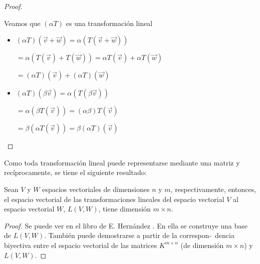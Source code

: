 \begin{corollary}
\begin{proof}
\begin{itemize}
Veamos que $(\alpha T)$ es una transformación lineal

\bigskip

\begin{itemize}
\item $(\alpha T)(\vec{v} + \vec{w} ) = \alpha (T(\vec{v} + \vec{w} ))$

$= \alpha (T(\vec{v}) + T(\vec{w} ))=  \alpha T(\vec{v}) + \alpha T(\vec{w} )    $

$=(\alpha T)(\vec{v}) + (\alpha T)(\vec{w} )$


\bigskip

\item 
$ (\alpha T)( \beta  \vec{v})=  \alpha (T( \beta  \vec{v})) $ 

$= \alpha (  \beta   T(  \vec{v})) =  (\alpha  \beta)   T(  \vec{v})  $

$= \beta (\alpha T(  \vec{v}))=  \beta (\alpha T)(  \vec{v})  $
\end{itemize}


\end{itemize}

\end{proof}
\end{corollary}



\bigskip

\bigskip

Como toda transformación lineal puede representarse mediante una matriz y recíprocamente, se tiene el siguiente resultado:


\bigskip

\bigskip

\begin{corollary}
\label{TEO3}

Sean $V$ y $W$ espacios vectoriales de dimensiones $n$ y $m$, respectivamente, entonces, el espacio vectorial de las transformaciones lineales del espacio vectorial  $V$ al espacio vectorial $W$, $L(V,W)$,  tiene dimensión $m\times n$.



\begin{proof}
 Se puede ver   en el libro de  E. Hernández \cite{hernandez}. En ella se construye una base de $L(V,W)$. También puede demostrarse  a partir de la correspon-\ dencia biyectiva entre el espacio vectorial de las matrices $K^{m \times n}$ (de dimensión $m \times n$) y  $L(V,W)$.

\end{proof}

\end{corollary}




